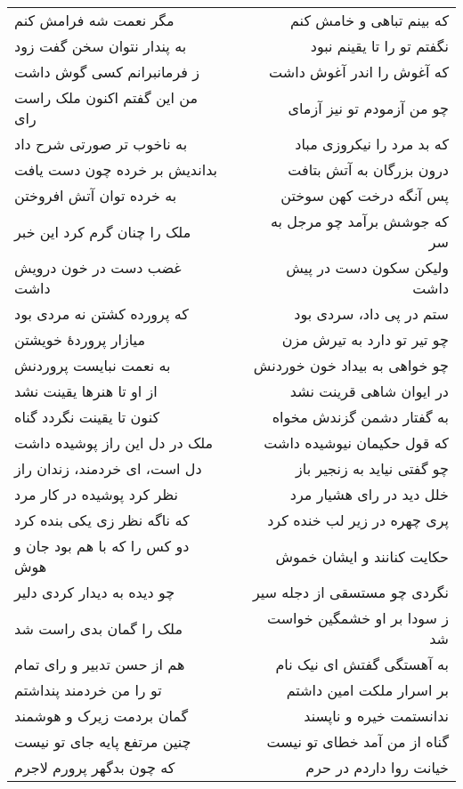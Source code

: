 \begin{center}
\begin{longtable}{l p{0.5cm} r}
\\
مگر نعمت شه فرامش کنم
&&
که بینم تباهی و خامش کنم
\\
به پندار نتوان سخن گفت زود
&&
نگفتم تو را تا یقینم نبود
\\
ز فرمانبرانم کسی گوش داشت
&&
که آغوش را اندر آغوش داشت
\\
من این گفتم اکنون ملک راست رای
&&
چو من آزمودم تو نیز آزمای
\\
به ناخوب تر صورتی شرح داد
&&
که بد مرد را نیکروزی مباد
\\
بداندیش بر خرده چون دست یافت
&&
درون بزرگان به آتش بتافت
\\
به خرده توان آتش افروختن
&&
پس آنگه درخت کهن سوختن
\\
ملک را چنان گرم کرد این خبر
&&
که جوشش برآمد چو مرجل به سر
\\
غضب دست در خون درویش داشت
&&
ولیکن سکون دست در پیش داشت
\\
که پرورده کشتن نه مردی بود
&&
ستم در پی داد، سردی بود
\\
میازار پروردهٔ خویشتن
&&
چو تیر تو دارد به تیرش مزن
\\
به نعمت نبایست پروردنش
&&
چو خواهی به بیداد خون خوردنش
\\
از او تا هنرها یقینت نشد
&&
در ایوان شاهی قرینت نشد
\\
کنون تا یقینت نگردد گناه
&&
به گفتار دشمن گزندش مخواه
\\
ملک در دل این راز پوشیده داشت
&&
که قول حکیمان نیوشیده داشت
\\
دل است، ای خردمند، زندان راز
&&
چو گفتی نیاید به زنجیر باز
\\
نظر کرد پوشیده در کار مرد
&&
خلل دید در رای هشیار مرد
\\
که ناگه نظر زی یکی بنده کرد
&&
پری چهره در زیر لب خنده کرد
\\
دو کس را که با هم بود جان و هوش
&&
حکایت کنانند و ایشان خموش
\\
چو دیده به دیدار کردی دلیر
&&
نگردی چو مستسقی از دجله سیر
\\
ملک را گمان بدی راست شد
&&
ز سودا بر او خشمگین خواست شد
\\
هم از حسن تدبیر و رای تمام
&&
به آهستگی گفتش ای نیک نام
\\
تو را من خردمند پنداشتم
&&
بر اسرار ملکت امین داشتم
\\
گمان بردمت زیرک و هوشمند
&&
ندانستمت خیره و ناپسند
\\
چنین مرتفع پایه جای تو نیست
&&
گناه از من آمد خطای تو نیست
\\
که چون بدگهر پرورم لاجرم
&&
خیانت روا داردم در حرم
\\

\end{longtable}
\end{center}
